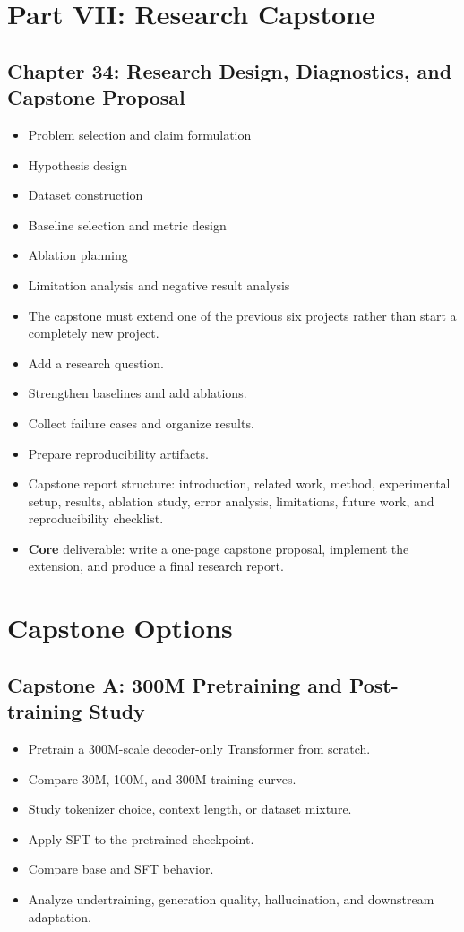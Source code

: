 \documentclass[11pt]{article}
\begin{document}
\section{Part VII: Research Capstone}

\subsection{Chapter 34: Research Design, Diagnostics, and Capstone Proposal}

\begin{itemize}
    \item Problem selection and claim formulation
    \item Hypothesis design
    \item Dataset construction
    \item Baseline selection and metric design
    \item Ablation planning
    \item Limitation analysis and negative result analysis
    \item The capstone must extend one of the previous six projects rather than start a completely new project.
    \item Add a research question.
    \item Strengthen baselines and add ablations.
    \item Collect failure cases and organize results.
    \item Prepare reproducibility artifacts.
    \item Capstone report structure: introduction, related work, method, experimental setup, results, ablation study, error analysis, limitations, future work, and reproducibility checklist.
    \item \textbf{Core} deliverable: write a one-page capstone proposal, implement the extension, and produce a final research report.
\end{itemize}

\section*{Capstone Options}

\subsection*{Capstone A: 300M Pretraining and Post-training Study}

\begin{itemize}
    \item Pretrain a 300M-scale decoder-only Transformer from scratch.
    \item Compare 30M, 100M, and 300M training curves.
    \item Study tokenizer choice, context length, or dataset mixture.
    \item Apply SFT to the pretrained checkpoint.
    \item Compare base and SFT behavior.
    \item Analyze undertraining, generation quality, hallucination, and downstream adaptation.
\end{itemize}
\end{document}
